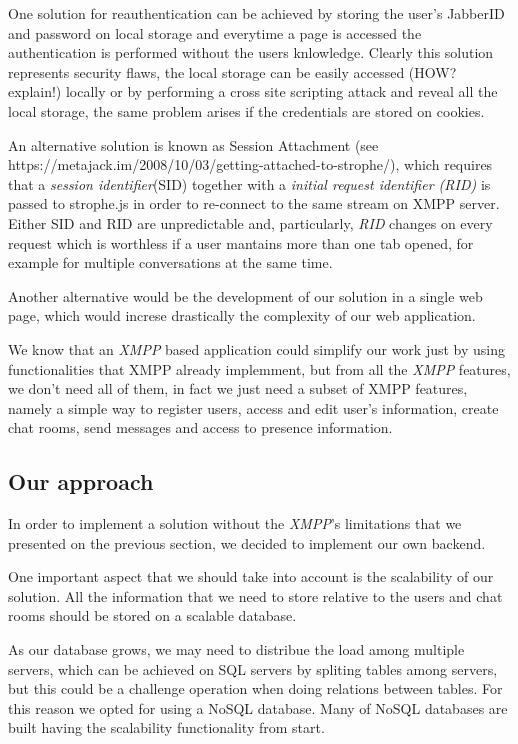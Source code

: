 \documentclass[
10pt, %
a4paper, %
oneside, %
]{scrartcl}
\begin{document}
One solution for reauthentication can be achieved by storing the user's JabberID and password on local storage and everytime a page is accessed the authentication is performed without the users knlowledge. Clearly this solution represents security flaws, the local storage can be easily accessed (HOW? explain!) locally or by performing a cross site scripting attack and reveal all the local storage, the same problem arises if the credentials are stored on cookies.

An alternative solution is known as Session Attachment (see https://metajack.im/2008/10/03/getting-attached-to-strophe/), which requires that a \textit{session identifier}(SID) together with a \textit{initial request identifier (RID)} is passed to strophe.js in order to re-connect to the same stream on XMPP server. Either SID and RID are unpredictable and, particularly, \textit{RID} changes on every request which is worthless if a user mantains more than one tab opened, for example for multiple conversations at the same time.

Another alternative would be the development of our solution in a single web page, which would increse drastically the complexity of our web application.

We know that an \textit{XMPP} based application could simplify our work just by using functionalities that XMPP already implemment, but from all the \textit{XMPP} features, we don't need all of them, in fact we just need a subset of XMPP features, namely a simple way to register users, access and edit user's information, create chat rooms, send messages and access to presence information.

\subsection{Our approach}

In order to implement a solution without the \textit{XMPP}'s limitations that we presented on the previous section, we decided to implement our own backend. 

One important aspect that we should take into account is the scalability of our solution. All the information that we need to store relative to the users and chat rooms should be stored on a scalable database. 

As our database grows, we may need to distribue the load among multiple servers, which can be achieved on SQL servers by spliting tables among servers, but this could be a challenge operation when doing relations between tables. For this reason we opted for using a NoSQL database. Many of NoSQL databases are built having the scalability functionality from start.
\end{document}
